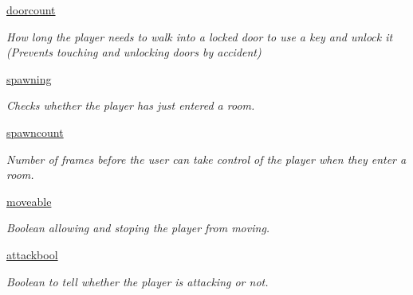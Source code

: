 \begin{DoxyCompactItemize}
\hyperlink{classactor_1_1player_1_1_player_ad9f2b3abde9b91875f4840fed4f64da2}{doorcount}
\begin{DoxyCompactList}\small\item\em How long the player needs to walk into a locked door to use a key and unlock it (Prevents touching and unlocking doors by accident) \end{DoxyCompactList}\item 
\mbox{\label{classactor_1_1player_1_1_player_ab086494231fe0db5a191209fb496aa32}} 
\hyperlink{classactor_1_1player_1_1_player_ab086494231fe0db5a191209fb496aa32}{spawning}
\begin{DoxyCompactList}\small\item\em Checks whether the player has just entered a room. \end{DoxyCompactList}\item 
\mbox{\label{classactor_1_1player_1_1_player_acf96b0094e3294d7c0d0dcc23a2450e2}} 
\hyperlink{classactor_1_1player_1_1_player_acf96b0094e3294d7c0d0dcc23a2450e2}{spawncount}
\begin{DoxyCompactList}\small\item\em Number of frames before the user can take control of the player when they enter a room. \end{DoxyCompactList}\item 
\mbox{\label{classactor_1_1player_1_1_player_a62a06e2de507cf924ceb42c478e0acb9}} 
\hyperlink{classactor_1_1player_1_1_player_a62a06e2de507cf924ceb42c478e0acb9}{moveable}
\begin{DoxyCompactList}\small\item\em Boolean allowing and stoping the player from moving. \end{DoxyCompactList}\item 
\mbox{\label{classactor_1_1player_1_1_player_a77d57d979bab2c2918501b536130cd4f}} 
\hyperlink{classactor_1_1player_1_1_player_a77d57d979bab2c2918501b536130cd4f}{attackbool}
\begin{DoxyCompactList}\small\item\em Boolean to tell whether the player is attacking or not. \end{DoxyCompactList}\item 
\mbox{\label{classactor_1_1player_1_1_player_a9014fc320d75f42a42067131ef359521}} 

\end{DoxyCompactItemize}
